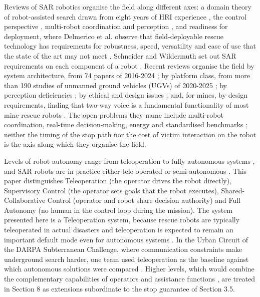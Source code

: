 Reviews of SAR robotics organise the field along different axes: a domain theory of robot-assisted search drawn from eight years of HRI experience \cite{murphy2004hri}, the control perspective \cite{liu2013}, multi-robot coordination and perception \cite{queralta2020}, and readiness for deployment, where Delmerico et al. observe that field-deployable rescue technology has requirements for robustness, speed, versatility and ease of use that the state of the art may not meet \cite{delmerico2019}. Schneider and Wildermuth set out SAR requirements on each component of a robot \cite{schneider2016}. Recent reviews organise the field by system architecture, from 74 papers of 2016-2024 \cite{kareem2026}; by platform class, from more than 190 studies of unmanned ground vehicles (UGVs) of 2020-2025 \cite{sinha2026}; by perception deficiencies \cite{tong2024}; by ethical and design issues \cite{chitikena2023}; and, for mines, by design requirements, finding that two-way voice is a fundamental functionality of most mine rescue robots \cite{bakzadeh2026}. The open problems they name include multi-robot coordination, real-time decision-making, energy and standardised benchmarks \cite{kareem2026,sinha2026}; neither the timing of the stop path nor the cost of victim interaction on the robot is the axis along which they organise the field.

Levels of robot autonomy range from teleoperation to fully autonomous systems \cite{beer2014}, and SAR robots are in practice either tele-operated or semi-autonomous \cite{schneider2016}. This paper distinguishes Teleoperation (the operator drives the robot directly), Supervisory Control (the operator sets goals that the robot executes), Shared-Collaborative Control (operator and robot share decision authority) and Full Autonomy (no human in the control loop during the mission). The system presented here is a Teleoperation system, because rescue robots are typically teleoperated in actual disasters \cite{daun2023} and teleoperation is expected to remain an important default mode even for autonomous systems \cite{chen2007}. In the Urban Circuit of the DARPA Subterranean Challenge, where communication constraints make underground search harder, one team used teleoperation as the baseline against which autonomous solutions were compared \cite{isaacs2022}. Higher levels, which would combine the complementary capabilities of operators and assistance functions \cite{daun2023}, are treated in Section 8 as extensions subordinate to the stop guarantee of Section 3.5.

